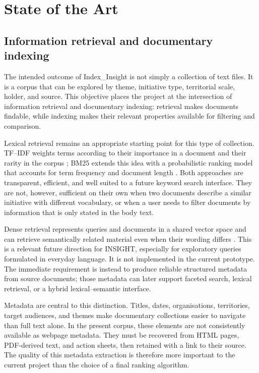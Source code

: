 \chapter{State of the Art}

\section{Information retrieval and documentary indexing}

The intended outcome of Index\_Insight is not simply a collection of text
files. It is a corpus that can be explored by theme, initiative type,
territorial scale, holder, and source. This objective places the project at the
intersection of information retrieval and documentary indexing: retrieval makes
documents findable, while indexing makes their relevant properties available
for filtering and comparison.

Lexical retrieval remains an appropriate starting point for this type of
collection. TF--IDF weights terms according to their importance in a document
and their rarity in the corpus \citep{salton1988term}; BM25 extends this idea
with a probabilistic ranking model that accounts for term frequency and document
length \citep{robertson2009probabilistic}. Both approaches are transparent,
efficient, and well suited to a future keyword search interface. They are not,
however, sufficient on their own when two documents describe a similar
initiative with different vocabulary, or when a user needs to filter documents
by information that is only stated in the body text.

Dense retrieval represents queries and documents in a shared vector space and
can retrieve semantically related material even when their wording differs
\citep{karpukhin2020dense}. This is a relevant future direction for INSIGHT,
especially for exploratory queries formulated in everyday language. It is not
implemented in the current prototype. The immediate requirement is instead to
produce reliable structured metadata from source documents; those metadata can
later support faceted search, lexical retrieval, or a hybrid lexical--semantic
interface.

Metadata are central to this distinction. Titles, dates, organisations,
territories, target audiences, and themes make documentary collections easier
to navigate than full text alone. In the present corpus, these elements are not
consistently available as webpage metadata. They must be recovered from HTML
pages, PDF-derived text, and action sheets, then retained with a link to their
source. The quality of this metadata extraction is therefore more important to
the current project than the choice of a final ranking algorithm.

